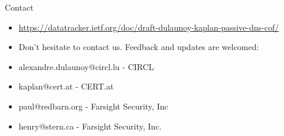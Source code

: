 \begin{frame}[t]{Contact}

\begin{itemize}
\item \url{https://datatracker.ietf.org/doc/draft-dulaunoy-kaplan-passive-dns-cof/}
\item Don't hesitate to contact us. Feedback and updates are welcomed:
\item alexandre.dulaunoy@circl.lu - CIRCL
\item kaplan@cert.at - CERT.at
\item paul@redbarn.org - Farsight Security, Inc
\item henry@stern.ca - Farsight Security, Inc.
\end{itemize}
\end{frame}



